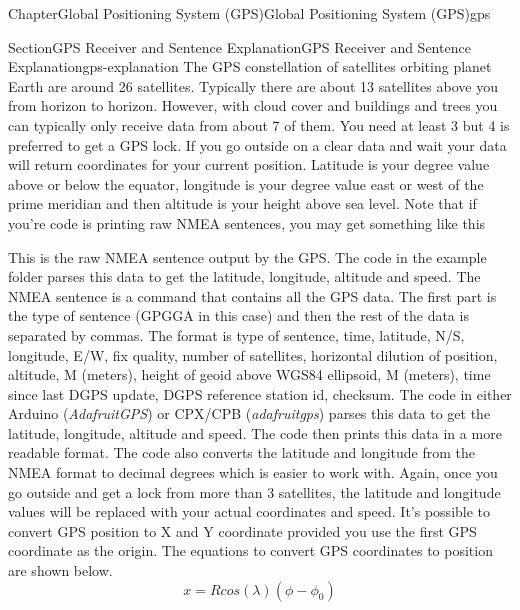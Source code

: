 \documentclass[oneside,10pt,]{book}
\numberwithin{equation}{section}
\begin{document}
\begin{chapterptx}{Chapter}{Global Positioning System (GPS)}{}{Global Positioning System (GPS)}{}{}{gps}
\typeout{************************************************}
%
\begin{sectionptx}{Section}{GPS Receiver and Sentence Explanation}{}{GPS Receiver and Sentence Explanation}{}{}{gps-explanation}
The GPS constellation of satellites orbiting planet Earth are around 26 satellites. Typically there are about 13 satellites above you from horizon to horizon. However, with cloud cover and buildings and trees you can typically only receive data from about 7 of them. You need at least 3 but 4 is preferred to get a GPS lock. If you go outside on a clear data and wait your data will return coordinates for your current position. Latitude is your degree value above or below the equator, longitude is your degree value east or west of the prime meridian and then altitude is your height above sea level. Note that if you're code is printing raw NMEA sentences, you may get something like this
This is the raw NMEA sentence output by the GPS. The code in the example folder parses this data to get the latitude, longitude, altitude and speed. The NMEA sentence is a command that contains all the GPS data. The first part is the type of sentence (GPGGA in this case) and then the rest of the data is separated by commas. The format is type of sentence, time, latitude, N\slash{}S, longitude, E\slash{}W, fix quality, number of satellites, horizontal dilution of position, altitude, M (meters), height of geoid above WGS84 ellipsoid, M (meters), time since last DGPS update, DGPS reference station id, checksum. The code in either Arduino (\emph{Adafruit\textunderscore{}GPS}) or CPX\slash{}CPB (\emph{adafruit\textunderscore{}gps}) parses this data to get the latitude, longitude, altitude and speed. The code then prints this data in a more readable format. The code also converts the latitude and longitude from the NMEA format to decimal degrees which is easier to work with. Again, once you go outside and get a lock from more than 3 satellites, the latitude and longitude values will be replaced with your actual coordinates and speed. It's possible to convert GPS position to X and Y coordinate provided you use the first GPS coordinate as the origin. The equations to convert GPS coordinates to position are shown below.%
\begin{equation}
x = R cos(\lambda)(\phi - \phi_0) \label{gps-explanation-2-4}

\end{equation}
\end{sectionptx}
\end{chapterptx}
\end{document}

